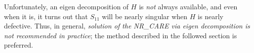 Unfortunately, an eigen decomposition of $H$ is {\it not} always available, and even when it is, it turns out that $S_{11}$ will be nearly singular
when $H$ is nearly defective.  Thus, in general, {\it solution of the NR_CARE via eigen decomposition is not recommended in practice}; the method
described in the followed section is preferred.


\begin{figure*}[t]

\end{figure*}

